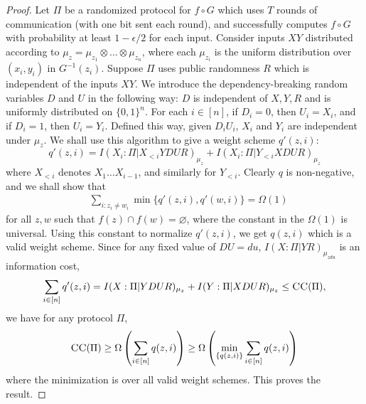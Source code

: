 \documentclass[10pt,a4paper]{article}
\theoremstyle{definition}
\newcommand{\B}{\{0,1\}}
\newcommand{\CC}{\textsc{CC}}
\renewcommand{\>}{\rangle}
\newcommand{\<}{\langle}
\begin{document}
\begin{proof}
Let $\Pi$ be a randomized protocol for $f\circ G$ which uses $T$ rounds
of communication (with one bit sent each round), and successfully computes $f\circ G$ with probability at least $1-\epsilon/2$ for each input. Consider inputs $XY$ distributed according to $\mu_z = \mu_{z_1}\otimes\ldots\otimes\mu_{z_n}$, where each $\mu_{z_i}$ is the uniform distribution over $(x_i,y_i)$ in $G^{-1}(z_i)$. Suppose $\Pi$ uses public randomness $R$ which is independent of the inputs $XY$. We introduce the dependency-breaking random variables $D$ and $U$ \cite{BJKS04} in the following way: $D$ is independent of $X, Y, R$ and is uniformly distributed on $\B^n$. For each $i \in [n]$, if $D_i=0$, then $U_i = X_i$, and if $D_i=1$, then $U_i=Y_i$. Defined this way, given $D_iU_i$, $X_i$ and $Y_i$ are independent under $\mu_z$. We shall use this algorithm to give a weight scheme $q'(z,i)$:
\[q'(z,i)=I(X_i:\Pi|X_{<i} YDUR)_{\mu_z} + I(X_i:\Pi|Y_{<i}XDUR)_{\mu_z}\]
where $X_{<i}$ denotes $X_1\ldots X_{i-1}$, and similarly for $Y_{<i}$. Clearly $q$ is non-negative, and we shall show that
\begin{align*}
& \sum_{i:z_i\neq w_i}\min\{q'(z,i),q'(w,i)\} = \Omega(1)
\end{align*}
for all $z,w$ such that $f(z) \cap f(w) = \varnothing$, where the constant in the $\Omega(1)$ is universal. Using this constant to normalize $q'(z,i)$, we get $q(z,i)$ which is a valid weight scheme. Since for any fixed value of $DU=du$, $I(X:\Pi|YR)_{\mu_{zdu}}$ is an information cost,
\[ \sum_{i \in [n]}q'(z,i) = I(X:\Pi|YDUR)_{\mu_z} + I(Y:\Pi|XDUR)_{\mu_z} \leq \CC(\Pi),\]
we have for any protocol $\Pi$,
\[ \CC(\Pi) \geq \Omega\left(\sum_{i \in [n]}q(z,i)\right) \geq \Omega\left(\min_{\{q(z,i)\}}\sum_{i \in [n]}q(z,i)\right) \]
where the minimization is over all valid weight schemes. This proves the result.


\end{proof}
\end{document}
